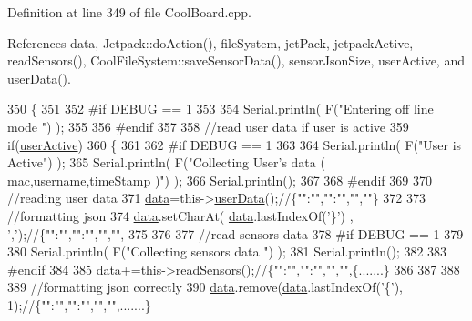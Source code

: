 Definition at line 349 of file Cool\+Board.\+cpp.



References data, Jetpack\+::do\+Action(), file\+System, jet\+Pack, jetpack\+Active, read\+Sensors(), Cool\+File\+System\+::save\+Sensor\+Data(), sensor\+Json\+Size, user\+Active, and user\+Data().


\begin{DoxyCode}
350 \{
351 
352 \textcolor{preprocessor}{#if DEBUG == 1  }
353     
354     Serial.println( F(\textcolor{stringliteral}{"Entering off line mode "}) ); 
355     
356 \textcolor{preprocessor}{#endif}
357 
358     \textcolor{comment}{//read user data if user is active}
359     \textcolor{keywordflow}{if}(\hyperlink{classCoolBoard_a6395459131d6889a3005f79c7a35e964}{userActive})
360     \{
361 
362 \textcolor{preprocessor}{    #if DEBUG == 1}
363         
364         Serial.println( F(\textcolor{stringliteral}{"User is Active"}) );
365         Serial.println( F(\textcolor{stringliteral}{"Collecting User's data ( mac,username,timeStamp )"}) );
366         Serial.println();
367 
368 \textcolor{preprocessor}{    #endif}
369 
370         \textcolor{comment}{//reading user data}
371         \hyperlink{classCoolBoard_a427fb753dd8575bdf821c70a5c63d695}{data}=this->\hyperlink{classCoolBoard_ae7358fb6e623cfc81b775f5f1734909b}{userData}();\textcolor{comment}{//\{"":"","":"","",""\}}
372 
373         \textcolor{comment}{//formatting json }
374         \hyperlink{classCoolBoard_a427fb753dd8575bdf821c70a5c63d695}{data}.setCharAt( \hyperlink{classCoolBoard_a427fb753dd8575bdf821c70a5c63d695}{data}.lastIndexOf(\textcolor{charliteral}{'\}'}) , \textcolor{charliteral}{','});\textcolor{comment}{//\{"":"","":"","","",}
375         
376                 
377         \textcolor{comment}{//read sensors data}
378 \textcolor{preprocessor}{    #if DEBUG == 1}
379 
380         Serial.println( F(\textcolor{stringliteral}{"Collecting sensors data "}) );
381         Serial.println();
382 
383 \textcolor{preprocessor}{    #endif}
384 
385         \hyperlink{classCoolBoard_a427fb753dd8575bdf821c70a5c63d695}{data}+=this->\hyperlink{classCoolBoard_ad03abdce2e65f520bbf2cff0f2d083cf}{readSensors}();\textcolor{comment}{//\{"":"","":"","","",\{.......\}}
386 
387         
388 
389         \textcolor{comment}{//formatting json correctly}
390         \hyperlink{classCoolBoard_a427fb753dd8575bdf821c70a5c63d695}{data}.remove(\hyperlink{classCoolBoard_a427fb753dd8575bdf821c70a5c63d695}{data}.lastIndexOf(\textcolor{charliteral}{'\{'}), 1);\textcolor{comment}{//\{"":"","":"","","",.......\}}

\end{DoxyCode}
